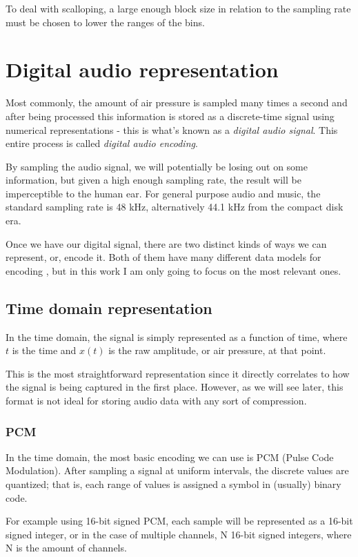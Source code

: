 To deal with scalloping, a large enough block size in relation to the sampling rate must be chosen to lower the ranges of the bins.

\section{Digital audio representation}
Most commonly, the amount of air pressure is sampled many times a second and after being processed this information is stored as a discrete-time signal using numerical representations - this is what's known as a \emph{digital audio signal}. This entire process is called \emph{digital audio encoding}.

By sampling the audio signal, we will potentially be losing out on some information, but given a high enough sampling rate, the result will be imperceptible to the human ear. For general purpose audio and music, the standard sampling rate is 48 kHz, alternatively 44.1 kHz from the compact disk era.

Once we have our digital signal, there are two distinct kinds of ways we can represent, or, encode it. Both of them have many different data models for encoding \cite{you_2010}, but in this work I am only going to focus on the most relevant ones.

\subsection{Time domain representation}
In the time domain, the signal is simply represented as a function of time, where $t$ is the time and $x(t)$ is the raw amplitude, or air pressure, at that point. \cite{bosi_goldberg_2003}

This is the most straightforward representation since it directly correlates to how the signal is being captured in the first place. However, as we will see later, this format is not ideal for storing audio data with any sort of compression.

\subsubsection{PCM}
In the time domain, the most basic encoding we can use is PCM (Pulse Code Modulation). After sampling a signal at uniform intervals, the discrete values are quantized; that is, each range of values is assigned a symbol in (usually) binary code.

For example using 16-bit signed PCM, each sample will be represented as a 16-bit signed integer, or in the case of multiple channels, N 16-bit signed integers, where N is the amount of channels.

